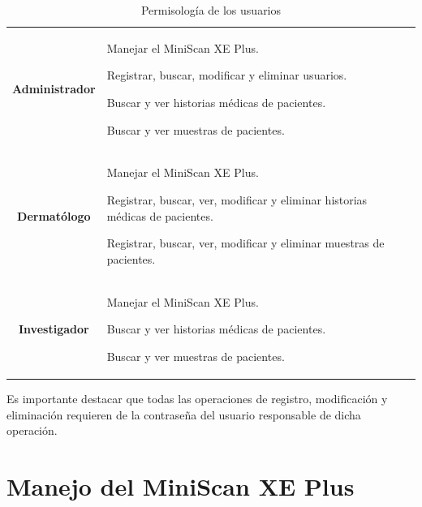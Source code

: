 \begin{table}[h]
		\small
		\caption[]{Permisolog\'{i}a de los usuarios}
		\centering
		\setlength{\extrarowheight}{\altocelda}
		\begin{tabulary}{\anchotabla}{|c|J|}
			\hline
			 & \\ \hline
			
			\textbf{Administrador} &
			
			Manejar el MiniScan XE Plus.
			
			Registrar, buscar, modificar y eliminar usuarios.
			
			Buscar y ver historias m\'{e}dicas de pacientes.
			
			Buscar y ver muestras de pacientes.\\ \hline
			
			\textbf{Dermat\'{o}logo} &
			
			Manejar el MiniScan XE Plus.
			
			Registrar, buscar, ver, modificar y eliminar historias m\'{e}dicas de pacientes.
			
			Registrar, buscar, ver, modificar y eliminar muestras de pacientes.\\ \hline
			
			\textbf{Investigador} &
			
			Manejar el MiniScan XE Plus.
			
			Buscar y ver historias m\'{e}dicas de pacientes.
			
			Buscar y ver muestras de pacientes.\\ \hline
		\end{tabulary}
	\end{table}

	Es importante destacar que todas las operaciones de registro, modificaci\'{o}n y eliminaci\'{o}n requieren de la contrase\~{n}a del usuario responsable de dicha operaci\'{o}n.
	
\newpage

\section*{Manejo del MiniScan XE Plus}

